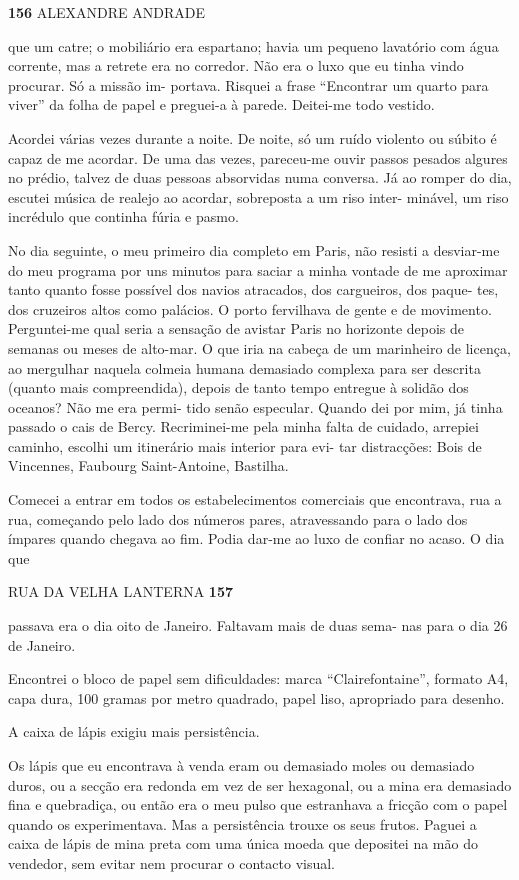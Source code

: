 \textbf{156 }ALEXANDRE ANDRADE

que um catre; o mobiliário era espartano; havia um pequeno lavatório com
água corrente, mas a retrete era no corredor. Não era o luxo que eu
tinha vindo procurar. Só a missão im- portava. Risquei a frase
``Encontrar um quarto para viver'' da folha de papel e preguei-a à
parede. Deitei-me todo vestido.

Acordei várias vezes durante a noite. De noite, só um ruído violento ou
súbito é capaz de me acordar. De uma das vezes, pareceu-me ouvir passos
pesados algures no prédio, talvez de duas pessoas absorvidas numa
conversa. Já ao romper do dia, escutei música de realejo ao acordar,
sobreposta a um riso inter- minável, um riso incrédulo que continha
fúria e pasmo.

No dia seguinte, o meu primeiro dia completo em Paris, não resisti a
desviar-me do meu programa por uns minutos para saciar a minha vontade
de me aproximar tanto quanto fosse possível dos navios atracados, dos
cargueiros, dos paque- tes, dos cruzeiros altos como palácios. O porto
fervilhava de gente e de movimento. Perguntei-me qual seria a sensação
de avistar Paris no horizonte depois de semanas ou meses de alto-mar. O
que iria na cabeça de um marinheiro de licença, ao mergulhar naquela
colmeia humana demasiado complexa para ser descrita (quanto mais
compreendida), depois de tanto tempo entregue à solidão dos oceanos? Não
me era permi- tido senão especular. Quando dei por mim, já tinha passado
o cais de Bercy. Recriminei-me pela minha falta de cuidado, arrepiei
caminho, escolhi um itinerário mais interior para evi- tar distracções:
Bois de Vincennes, Faubourg Saint-Antoine, Bastilha.

Comecei a entrar em todos os estabelecimentos comerciais que encontrava,
rua a rua, começando pelo lado dos números pares, atravessando para o
lado dos ímpares quando chegava ao fim. Podia dar-me ao luxo de confiar
no acaso. O dia que

RUA DA VELHA LANTERNA \textbf{157}

passava era o dia oito de Janeiro. Faltavam mais de duas sema- nas para
o dia 26 de Janeiro.

Encontrei o bloco de papel sem dificuldades: marca ``Clairefontaine'',
formato A4, capa dura, 100 gramas por metro quadrado, papel liso,
apropriado para desenho.

A caixa de lápis exigiu mais persistência.

Os lápis que eu encontrava à venda eram ou demasiado moles ou demasiado
duros, ou a secção era redonda em vez de ser hexagonal, ou a mina era
demasiado fina e quebradiça, ou então era o meu pulso que estranhava a
fricção com o papel quando os experimentava. Mas a persistência trouxe
os seus frutos. Paguei a caixa de lápis de mina preta com uma única
moeda que depositei na mão do vendedor, sem evitar nem procurar o
contacto visual.

